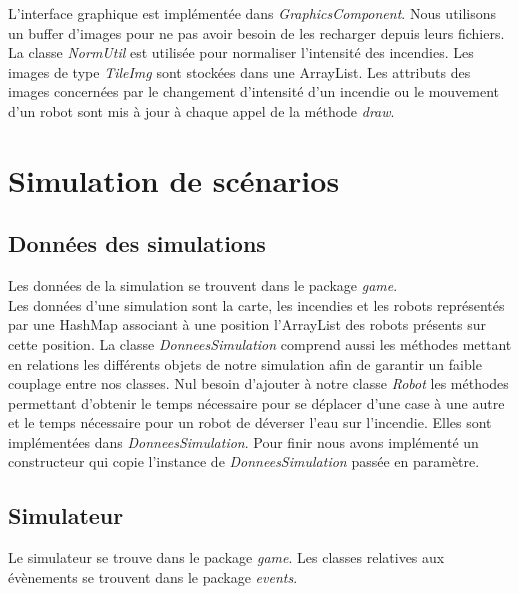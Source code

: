 \documentclass[a4paper, 10pt, french]{article}
\begin{document}
	L'interface graphique est implémentée dans {\it GraphicsComponent}. Nous utilisons un buffer d'images pour ne pas avoir besoin de les recharger depuis leurs fichiers. La classe {\it NormUtil} est utilisée pour normaliser l'intensité des incendies. Les images de type {\it TileImg} sont stockées dans une ArrayList. Les attributs des images concernées par le changement d'intensité d'un incendie ou le mouvement d'un robot sont mis à jour à chaque appel de la méthode {\it draw}.

\section{Simulation de scénarios}

	\subsection{Données des simulations}
	\noindent Les données de la simulation se trouvent dans le package {\it game}. \\

	Les données d'une simulation sont la carte, les incendies et les robots représentés par une HashMap associant à une position l'ArrayList des robots présents sur cette position. La classe {\it DonneesSimulation} comprend aussi les méthodes mettant en relations les différents objets de notre simulation afin de garantir un faible couplage entre nos classes. Nul besoin d'ajouter à notre classe {\it Robot} les méthodes permettant d'obtenir le temps nécessaire pour se déplacer d'une case à une autre et le temps nécessaire pour un robot de déverser l'eau sur l'incendie. Elles sont implémentées dans {\it DonneesSimulation}. Pour finir nous avons implémenté un constructeur qui copie l'instance de {\it DonneesSimulation} passée en paramètre. 
	
	\subsection{Simulateur}
	\noindent Le simulateur se trouve dans le package {\it game}. Les classes relatives aux évènements se trouvent dans le package {\it events}.\\
\end{document}
